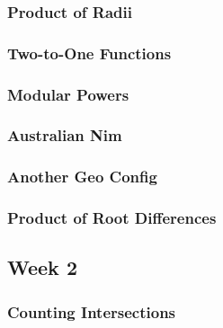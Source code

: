 \documentclass[titlepage=true]{scrartcl}
\begin{document}
        \subsubsection{Product of Radii}
            \label{8.1.2}  
            
        \newpage

        \subsubsection{Two-to-One Functions}
            \label{8.1.3}  
            
        \newpage

        \subsubsection{Modular Powers}
            \label{8.1.4}  
            
        \newpage

        \subsubsection{Australian Nim}
            \label{8.1.5}  
            
        \newpage

        \subsubsection{Another Geo Config}
            \label{8.1.6}  
            
        \newpage

        \subsubsection{Product of Root Differences}
            \label{8.1.7}  
            
        \newpage


    \subsection{Week 2}
    
        \subsubsection{Counting Intersections}
            \label{8.2.1}  
            
        \newpage
    
\end{document}
